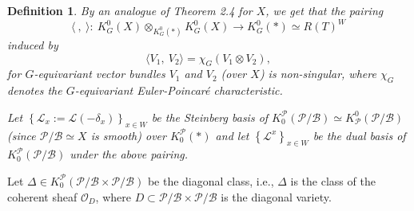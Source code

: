 \documentclass{article}
\newtheorem{definition}[theorem]{Definition}
\def\L{\mathcal{L}}
\def\P{\mathcal{P}}
\def\B{\mathcal{B}}
\def\ref#1{#1}
\begin{document}
\begin{definition}
{By an analogue of Theorem \ref{2.4} for $X$, we get that the pairing 
$$
\langle~,~\rangle :~ K_G^0 \left(X\right) \otimes_{K_G^0 \left(*\right) } K_G^0 \left(X\right)  \rightarrow K_G^0 \left(*\right) \simeq R(T)^W
$$
induced by 
$$
\langle V_1,~V_2\rangle= \chi_G\left(V_1\otimes V_2\right),
$$
for $G$-equivariant vector bundles $V_1$ and $V_2$ (over $X$)  is non-singular, where $\chi_G$ denotes the $G$-equivariant Euler-Poincar\'e characteristic. 

Let $\left\{\L_x:=\L\left(-\delta_x\right)\right\}_{x\in W}$ be the Steinberg basis of $K_0^\P\left(\P/\B\right)\simeq K_\P^0\left(\P/\B\right)$ (since $\P/\B \simeq X$ is smooth) over $K_0^\P (*)$ and 
let $\left\{\L^x\right\}_{x\in W}$ be the dual basis of $K_0^\P\left(\P/\B\right)$ under the above pairing.}
\end{definition}

Let $\Delta \in K_0^\P \left(\P/\B \times \P/\B\right)$ be the diagonal class, i.e., $\Delta$ is the class of the coherent sheaf $\mathcal{O}_D$, where $D\subset \P/\B \times \P/\B $ is the diagonal variety. 
\end{document}
